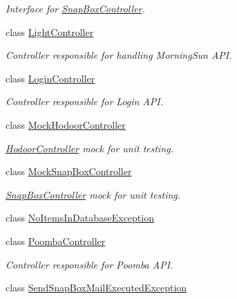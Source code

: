 \begin{DoxyCompactItemize}
\begin{DoxyCompactList}\small\item\em Interface for \mbox{\hyperlink{class_f_w_p_s_1_1_controllers_1_1_snap_box_controller}{Snap\+Box\+Controller}}. \end{DoxyCompactList}\item 
class \mbox{\hyperlink{class_f_w_p_s_1_1_controllers_1_1_light_controller}{Light\+Controller}}
\begin{DoxyCompactList}\small\item\em Controller responsible for handling Morning\+Sun A\+PI. \end{DoxyCompactList}\item 
class \mbox{\hyperlink{class_f_w_p_s_1_1_controllers_1_1_login_controller}{Login\+Controller}}
\begin{DoxyCompactList}\small\item\em Controller responsible for Login A\+PI. \end{DoxyCompactList}\item 
class \mbox{\hyperlink{class_f_w_p_s_1_1_controllers_1_1_mock_hodoor_controller}{Mock\+Hodoor\+Controller}}
\begin{DoxyCompactList}\small\item\em \mbox{\hyperlink{class_f_w_p_s_1_1_controllers_1_1_hodoor_controller}{Hodoor\+Controller}} mock for unit testing. \end{DoxyCompactList}\item 
class \mbox{\hyperlink{class_f_w_p_s_1_1_controllers_1_1_mock_snap_box_controller}{Mock\+Snap\+Box\+Controller}}
\begin{DoxyCompactList}\small\item\em \mbox{\hyperlink{class_f_w_p_s_1_1_controllers_1_1_snap_box_controller}{Snap\+Box\+Controller}} mock for unit testing. \end{DoxyCompactList}\item 
class \mbox{\hyperlink{class_f_w_p_s_1_1_controllers_1_1_no_items_in_database_exception}{No\+Items\+In\+Database\+Exception}}
\item 
class \mbox{\hyperlink{class_f_w_p_s_1_1_controllers_1_1_poomba_controller}{Poomba\+Controller}}
\begin{DoxyCompactList}\small\item\em Controller responsible for Poomba A\+PI. \end{DoxyCompactList}\item 
class \mbox{\hyperlink{class_f_w_p_s_1_1_controllers_1_1_send_snap_box_mail_executed_exception}{Send\+Snap\+Box\+Mail\+Executed\+Exception}}

\end{DoxyCompactItemize}
